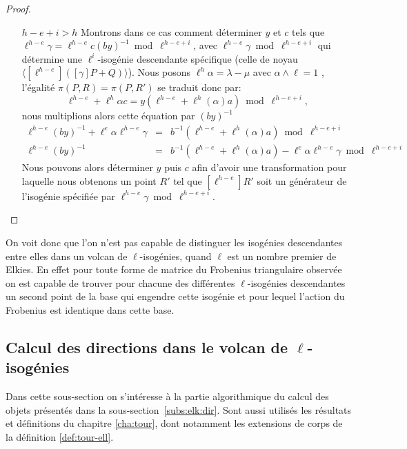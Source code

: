 \documentclass[10pt,a4paper]{book}
\theoremstyle{plain}
\theoremstyle{definition}
\theoremstyle{definition}
\theoremstyle{definition}
\theoremstyle{definition}
\theoremstyle{definition}
\theoremstyle{remark}
\theoremstyle{remark}
\theoremstyle{definition}
\begin{document}
\begin{proof}
\begin{itemize}
\item[$h-e+i>h$] %
Montrons dans ce cas comment déterminer
$y$ et $c$  tels que $\ell^{h-e}\gamma=\ell^{h-e}c(by)^{-1} \bmod 
\ell^{h-e+i}$, avec $\ell^{h-e}\gamma \bmod \ell^{h-e+i}$ qui détermine une 
$\ell^i$-isogénie descendante spécifique (celle de noyau $\langle [\ell^{h-e}]
([\gamma]P+Q) \rangle$). %
Nous posons $\ell^{h} \alpha = \lambda - \mu$ avec $\alpha \wedge \ell=1$
, l'égalité $\pi(P,R)=\pi(P,R')$ se traduit donc par:
\[  \ell^{h-e} + \ell^{h}\alpha c=y( \ell^{h-e}+\ell^{h}(\alpha)a) \bmod \ell^{h-e+i}, \]
nous multiplions alors cette équation par $(by)^{-1}$
\begin{eqnarray*}
 \ell^{h-e}(by)^{-1} + \ell^{e}\alpha \ell^{h-e} \gamma &=& b^{-1}( \ell^{h-e}+\ell^{h}(\alpha)a) \bmod \ell^{h-e+i} \\
\ell^{h-e}(by)^{-1} &=&  b^{-1}(\ell^{h-e}+\ell^{h}(\alpha)a) - \ell^{e}\alpha \ell^{h-e} \gamma \bmod \ell^{h-e+i} 
\end{eqnarray*}
Nous pouvons alors déterminer $y$ puis $c$ afin d'avoir une transformation pour 
laquelle nous obtenons un point $R'$ tel que $[\ell^{h-e}]R'$ soit un générateur 
de l'isogénie spécifiée par $\ell^{h-e}\gamma \bmod \ell^{h-e+i}$.

\end{itemize}
\end{proof}

On voit donc que l'on n'est pas capable de distinguer les isogénies 
descendantes entre elles dans un volcan de $\ell$-isogénies, quand $\ell$ est un 
nombre premier de Elkies. En effet pour toute forme de matrice du Frobenius 
triangulaire observée on est capable de trouver pour chacune des différentes 
$\ell$-isogénies descendantes un second point de la base qui engendre cette
isogénie et pour lequel l'action du Frobenius est identique dans cette base.

\subsection{Calcul des directions dans le volcan de $\ell$-isogénies}
\label{sub:con:poi}

Dans cette sous-section on s'intéresse à la partie algorithmique du calcul des
objets présentés dans la sous-section~\ref{subs:elk:dir}. Sont aussi utilisés 
les résultats et définitions du chapitre \ref{cha:tour}, dont notamment les 
extensions de corps de la définition \ref{def:tour-ell}.
\end{document}
